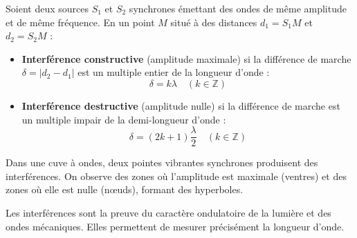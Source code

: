 \begin{propriete}
Soient deux sources $S_1$ et $S_2$ synchrones émettant des ondes de même amplitude et de même fréquence. En un point $M$ situé à des distances $d_1 = S_1M$ et $d_2 = S_2M$ :
\begin{itemize}
    \item \textbf{Interférence constructive} (amplitude maximale) si la différence de marche $\delta = |d_2 - d_1|$ est un multiple entier de la longueur d'onde :
    \[
    \boxed{\delta = k\lambda \quad (k \in \mathbb{Z})}
    \]
    \item \textbf{Interférence destructive} (amplitude nulle) si la différence de marche est un multiple impair de la demi-longueur d'onde :
    \[
    \boxed{\delta = (2k+1)\frac{\lambda}{2} \quad (k \in \mathbb{Z})}
    \]
\end{itemize}
\end{propriete}

\begin{illus}
\end{illus}

\begin{exemple}
Dans une cuve à ondes, deux pointes vibrantes synchrones produisent des interférences. On observe des zones où l'amplitude est maximale (ventres) et des zones où elle est nulle (nœuds), formant des hyperboles.
\end{exemple}

\begin{aretenir}
Les interférences sont la preuve du caractère ondulatoire de la lumière et des ondes mécaniques. Elles permettent de mesurer précisément la longueur d'onde.
\end{aretenir}

